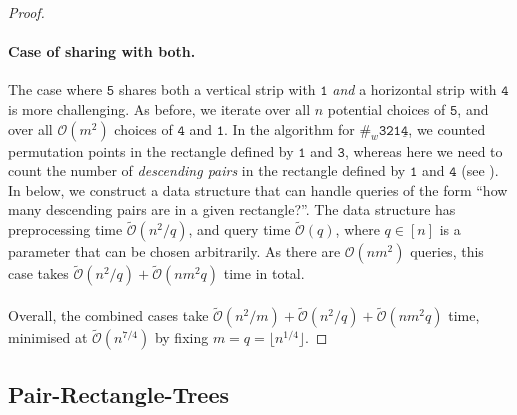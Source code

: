 \documentclass{article}
\newcommand{\pcwe}[1]{{\#_w \mathtt{ #1 } }}
\theoremstyle{remark}
\newcommand{\Otilde}[1]{\widetilde{\mathcal{O}}\left( #1 \right)}
\newcommand{\Oh}[1]{\mathcal{O}\left( #1 \right)}
\theoremstyle{plain}
\begin{document}
\begin{proof}
\paragraph{Case of sharing with both.}
The case where $\mathtt{5}$ shares both a vertical strip with $\mathtt{1}$
\textit{and} a horizontal strip with $\mathtt{4}$ is more challenging.
As before, we iterate over all $n$ potential choices of $\mathtt{5}$,
and over all $\Oh{m^2}$ choices of $\mathtt{4}$ and $\mathtt{1}$.
In the algorithm for $\pcwe{321\underline{4}}$,
we counted permutation points in the rectangle defined by $\mathtt{1}$ and $\mathtt{3}$,
whereas here we need to count the number of \emph{descending pairs}
in the rectangle defined by $\mathtt{1}$ and $\mathtt{4}$ (see ).
In  below, we construct a data structure that can handle queries of the form ``how many descending pairs are in a given rectangle?''.
The data structure has preprocessing time $\Otilde{n^2/q}$,
and query time $\Otilde{q}$, where $q\in [n]$ is a parameter that can be chosen arbitrarily.
As there are $\Oh{nm^2}$ queries, this case takes $\Otilde{n^2/q}+\Otilde{nm^2 q}$ time in total.

\paragraph{}
Overall, the combined cases take
$\Otilde{n^2/m} + \Otilde{n^2/q} + \Otilde{nm^2 q}$ time, minimised at $\Otilde{n^{7/4}}$ by fixing $m=q=\lfloor n^{1/4} \rfloor$.
\end{proof}

\subsection{Pair-Rectangle-Trees}
\label{subsect:pair_rect_trees}
\end{document}
